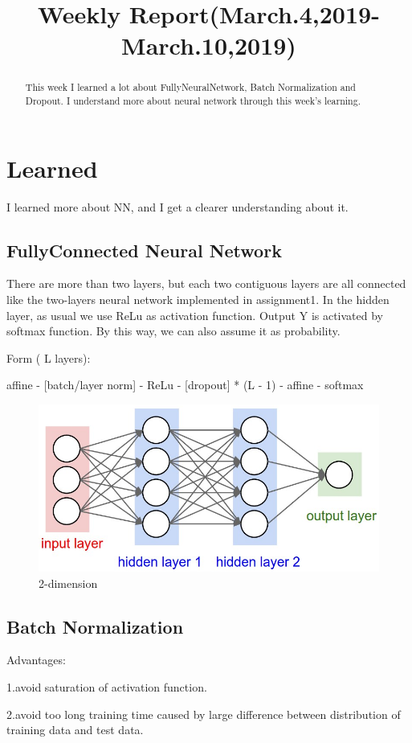 \documentclass{article} %
\title{Weekly Report(March.4,2019-March.10,2019)}
\begin{document}
\maketitle

\begin{abstract}
This week I learned a lot about FullyNeuralNetwork, Batch Normalization and Dropout. 
I understand more about neural network through this week's learning.
\end{abstract}

\section{Learned}
I learned more about NN, and I get a clearer understanding about it.

\subsection{FullyConnected Neural Network}
There are more than two layers, but each two contiguous layers are all connected like the two-layers neural network implemented in assignment1. In the hidden layer, as usual we use ReLu as activation function. Output Y is activated by softmax function. By this way, we can also assume it as probability.

Form ( L layers):
\begin{center}
{affine - [batch/layer norm] - ReLu - [dropout]} * (L - 1) - affine - softmax
\end{center}

\begin{figure}[h]
	\centering  %
	\includegraphics[width=.4\textwidth]{3.jpg} 
	\caption{2-dimension}  %
	\label{fig:f3}   %
\end{figure}

\subsection{Batch Normalization}
Advantages:

1.avoid saturation of activation function.

2.avoid too long training time caused by large difference between distribution of training data and test data.
\end{document}
